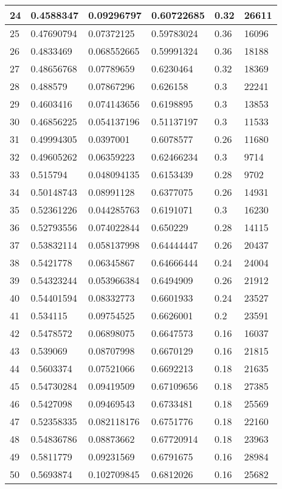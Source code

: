 \begin{longtable}{|l|l|l|l|l|l|}
24 & 0.4588347 & 0.09296797 & 0.60722685 & 0.32 & 26611 \\ \hline 
25 & 0.47690794 & 0.07372125 & 0.59783024 & 0.36 & 16096 \\ \hline 
26 & 0.4833469 & 0.068552665 & 0.59991324 & 0.36 & 18188 \\ \hline 
27 & 0.48656768 & 0.07789659 & 0.6230464 & 0.32 & 18369 \\ \hline 
28 & 0.488579 & 0.07867296 & 0.626158 & 0.3 & 22241 \\ \hline 
29 & 0.4603416 & 0.074143656 & 0.6198895 & 0.3 & 13853 \\ \hline 
30 & 0.46856225 & 0.054137196 & 0.51137197 & 0.3 & 11533 \\ \hline 
31 & 0.49994305 & 0.0397001 & 0.6078577 & 0.26 & 11680 \\ \hline 
32 & 0.49605262 & 0.06359223 & 0.62466234 & 0.3 & 9714 \\ \hline 
33 & 0.515794 & 0.048094135 & 0.6153439 & 0.28 & 9702 \\ \hline 
34 & 0.50148743 & 0.08991128 & 0.6377075 & 0.26 & 14931 \\ \hline 
35 & 0.52361226 & 0.044285763 & 0.6191071 & 0.3 & 16230 \\ \hline 
36 & 0.52793556 & 0.074022844 & 0.650229 & 0.28 & 14115 \\ \hline 
37 & 0.53832114 & 0.058137998 & 0.64444447 & 0.26 & 20437 \\ \hline 
38 & 0.5421778 & 0.06345867 & 0.64666444 & 0.24 & 24004 \\ \hline 
39 & 0.54323244 & 0.053966384 & 0.6494909 & 0.26 & 21912 \\ \hline 
40 & 0.54401594 & 0.08332773 & 0.6601933 & 0.24 & 23527 \\ \hline 
41 & 0.534115 & 0.09754525 & 0.6626001 & 0.2 & 23591 \\ \hline 
42 & 0.5478572 & 0.06898075 & 0.6647573 & 0.16 & 16037 \\ \hline 
43 & 0.539069 & 0.08707998 & 0.6670129 & 0.16 & 21815 \\ \hline 
44 & 0.5603374 & 0.07521066 & 0.6692213 & 0.18 & 21635 \\ \hline 
45 & 0.54730284 & 0.09419509 & 0.67109656 & 0.18 & 27385 \\ \hline 
46 & 0.5427098 & 0.09469543 & 0.6733481 & 0.18 & 25569 \\ \hline 
47 & 0.52358335 & 0.082118176 & 0.6751776 & 0.18 & 22160 \\ \hline 
48 & 0.54836786 & 0.08873662 & 0.67720914 & 0.18 & 23963 \\ \hline 
49 & 0.5811779 & 0.09231569 & 0.6791675 & 0.16 & 28984 \\ \hline 
50 & 0.5693874 & 0.102709845 & 0.6812026 & 0.16 & 25682 \\ \hline 
\end{longtable}